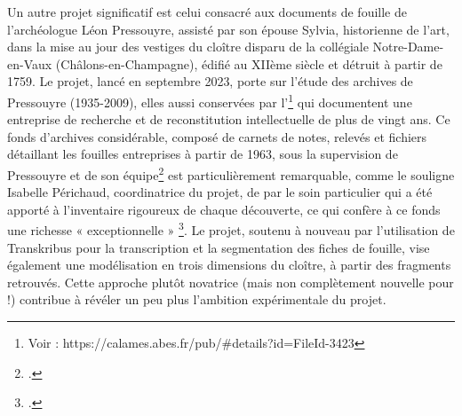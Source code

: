 Un autre projet significatif est celui consacré aux documents de fouille de l’archéologue Léon Pressouyre, assisté par son épouse Sylvia, historienne de l’art, dans la mise au jour des vestiges du cloître disparu de la collégiale Notre-Dame-en-Vaux (Châlons-en-Champagne), édifié au XIIème siècle et détruit à partir de 1759. 
Le projet, lancé en septembre 2023, porte sur l’étude des archives de Pressouyre (1935-2009), elles aussi conservées par l’\inha \footnote{Voir : https://calames.abes.fr/pub/\#details?id=FileId-3423}   qui documentent une entreprise de recherche et de reconstitution intellectuelle de plus de vingt ans. Ce fonds d’archives considérable, composé de carnets de notes, relevés et fichiers détaillant les fouilles entreprises à partir de 1963, sous la supervision de Pressouyre et de son équipe\footcite{inha_edition_nodate-1} est particulièrement remarquable, comme le souligne Isabelle Périchaud, coordinatrice du projet, de par le soin particulier qui a été apporté à l’inventaire rigoureux de chaque découverte, ce qui confère à ce fonds une richesse « exceptionnelle » \footcite{perichaud_a_2022}. 
Le projet, soutenu à nouveau par l’utilisation de Transkribus pour la transcription et la segmentation des fiches de fouille, vise également une modélisation en trois dimensions du cloître, à partir des fragments retrouvés. Cette approche plutôt novatrice (mais non complètement nouvelle pour \pense !) contribue à révéler un peu plus l’ambition expérimentale du projet. 
\newline
{}\\

